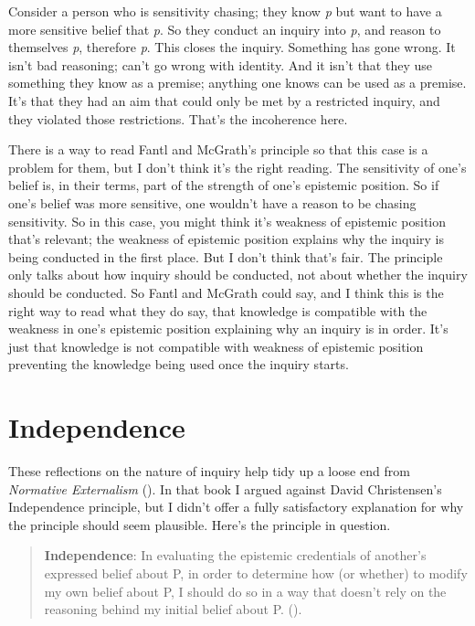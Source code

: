 \documentclass[
  12pt,
  letterpaper,
]{scrbook}
\begin{document}
Consider a person who is sensitivity chasing; they know \emph{p} but
want to have a more sensitive belief that \emph{p}. So they conduct an
inquiry into \emph{p}, and reason to themselves \emph{p}, therefore
\emph{p}. This closes the inquiry. Something has gone wrong. It isn't
bad reasoning; can't go wrong with identity. And it isn't that they use
something they know as a premise; anything one knows can be used as a
premise. It's that they had an aim that could only be met by a
restricted inquiry, and they violated those restrictions. That's the
incoherence here.

There is a way to read Fantl and McGrath's principle so that this case
is a problem for them, but I don't think it's the right reading. The
sensitivity of one's belief is, in their terms, part of the strength of
one's epistemic position. So if one's belief was more sensitive, one
wouldn't have a reason to be chasing sensitivity. So in this case, you
might think it's weakness of epistemic position that's relevant; the
weakness of epistemic position explains why the inquiry is being
conducted in the first place. But I don't think that's fair. The
principle only talks about how inquiry should be conducted, not about
whether the inquiry should be conducted. So Fantl and McGrath could say,
and I think this is the right way to read what they do say, that
knowledge is compatible with the weakness in one's epistemic position
explaining why an inquiry is in order. It's just that knowledge is not
compatible with weakness of epistemic position preventing the knowledge
being used once the inquiry starts.

\section{Independence}\label{sec-independence}

These reflections on the nature of inquiry help tidy up a loose end from
\emph{Normative Externalism} (). In that book I argued against David Christensen's Independence
principle, but I didn't offer a fully satisfactory explanation for why
the principle should seem plausible. Here's the principle in question.

\begin{quote}
\textbf{Independence}: In evaluating the epistemic credentials of
another's expressed belief about P, in order to determine how (or
whether) to modify my own belief about P, I should do so in a way that
doesn't rely on the reasoning behind my initial belief about P.
().
\end{quote}
\end{document}
